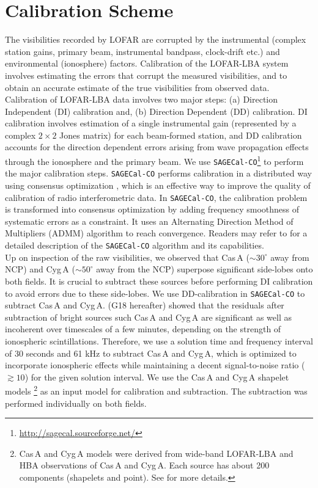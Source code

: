 \documentclass[fleqn,usenatbib]{mnras}
\begin{document}
\section{Calibration Scheme}\label{sec:calibration}

The visibilities recorded by LOFAR are corrupted by the instrumental (complex station gains, primary beam, instrumental bandpass, clock-drift etc.) and environmental (ionosphere) factors. Calibration of the LOFAR-LBA system involves estimating the errors that corrupt the measured visibilities, and to obtain an accurate estimate of the true visibilities from observed data. Calibration of LOFAR-LBA data involves two major steps: (a) Direction Independent (DI) calibration and, (b) Direction Dependent (DD) calibration. DI calibration involves estimation of a single instrumental gain (represented by a complex $2\times 2$ Jones matrix) for each beam-formed station, and DD calibration accounts for the direction dependent errors arising from wave propagation effects through the ionosphere and the primary beam. We use \texttt{SAGECal-CO}\footnote{\url{http://sagecal.sourceforge.net/}} to perform the major calibration steps. \texttt{SAGECal-CO} performs calibration in a distributed way using consensus optimization \citep{boyd2011}, which is an effective way to improve the quality of calibration of radio interferometric data. In \texttt{SAGECal-CO}, the calibration problem is transformed into consensus optimization by adding frequency smoothness of systematic errors as a constraint. It uses an Alternating Direction Method of Multipliers (ADMM) algorithm to reach convergence. Readers may refer to \cite{yatawatta2015,yatawatta2016,yatawatta2017,yatawatta2018} for a detailed description of the \texttt{SAGECal-CO} algorithm and its capabilities.
\\
Up on inspection of the raw visibilities, we observed that Cas\,A ($\sim 30^{\circ}$ away from NCP) and Cyg\,A ($\sim 50^{\circ}$ away from the NCP) superpose significant side-lobes onto both fields. It is crucial to subtract these sources before performing DI calibration to avoid errors due to these side-lobes. We use DD-calibration in \texttt{SAGECal-CO} to subtract Cas\,A and Cyg\,A. \cite{gehlot2018} (G18 hereafter) showed that the residuals after subtraction of bright sources such Cas\,A and Cyg\,A are significant as well as incoherent over timescales of a few minutes, depending on the strength of ionospheric scintillations. Therefore, we use a solution time and frequency interval of 30 seconds and 61 kHz to subtract Cas\,A and Cyg\,A, which is optimized to incorporate ionospheric effects while maintaining a decent signal-to-noise ratio ($\gtrsim 10$) for the given solution interval. We use the Cas\,A and Cyg\,A shapelet models \footnote{Cas\,A and Cyg\,A models were derived from wide-band LOFAR-LBA and HBA observations of Cas\,A and Cyg\,A. Each source has about 200 components (shapelets and point). See \cite{yatawatta2011} for more details.} as an input model for calibration and subtraction. The subtraction was performed individually on both fields. 
\end{document}
